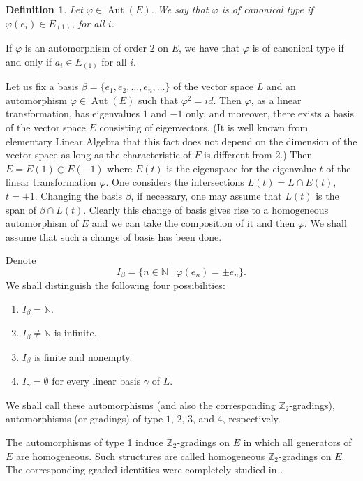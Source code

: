 \documentclass{article}
\newtheorem{definition}[theorem]{Definition}
\begin{document}
	\begin{definition}
		Let $\varphi \in \operatorname{Aut}(E)$. We say that $\varphi$ is of \emph{canonical type} if $\varphi(e_{i})\in E_{(1)}$, for all $i$.
	\end{definition}
	
	
	If $\varphi$ is an automorphism of order $2$ on $E$, we have that $\varphi$ is of canonical type if and only if $a_i \in E_{(1)}$ for all $i$.
	
	
	Let us fix a basis $\beta = \{e_1, e_2, \ldots, e_n, \ldots\}$ of the vector space $L$ and an automorphism 
	$\varphi \in \operatorname{Aut}(E)$ such that $\varphi^2 = id$. Then $\varphi$, as a linear transformation, has eigenvalues $1$ and $-1$ only, 
	and moreover, there exists a basis of the vector space $E$ consisting of eigenvectors. (It is well known from elementary Linear Algebra 
	that this fact does not depend on the dimension of the vector space as long as the characteristic of $F$ is different from $2$.) Then 
	$E = E(1) \oplus E(-1)$ where $E(t)$ is the eigenspace for the eigenvalue $t$ of the linear transformation $\varphi$. One considers the 
	intersections $L(t) = L \cap E(t)$, $t = \pm 1$. Changing the basis $\beta$, if necessary, one may assume that $L(t)$ is the span of 
	$\beta \cap L(t)$. Clearly this change of basis gives rise to a homogeneous automorphism of $E$ and we can take the composition of it 
	and then $\varphi$. We shall assume that such a change of basis has been done.
	
	Denote 
	\[
	I_\beta = \{ n \in \mathbb{N} \mid \varphi(e_n) = \pm e_n \}.
	\]
	We shall distinguish the following four possibilities:
	\begin{enumerate}
		\item $I_\beta = \mathbb{N}$.
		\item $I_\beta \neq \mathbb{N}$ is infinite.
		\item $I_\beta$ is finite and nonempty.
		\item $I_\gamma = \emptyset$ for every linear basis $\gamma$ of $L$.
	\end{enumerate}
	
	We shall call these automorphisms (and also the corresponding $\mathbb{Z}_2$-gradings), automorphisms (or gradings) of type $1$, $2$, $3$, 
	and $4$, respectively.
	
	The automorphisms of type 1 induce $\mathbb{Z}_2$-gradings on $E$ in which all generators of $E$ are homogeneous. Such structures are called homogeneous $\mathbb{Z}_2$-gradings on $E$. The corresponding graded identities were completely studied in \cite{disil, centroneP, LFG}. 
	
\end{document}
